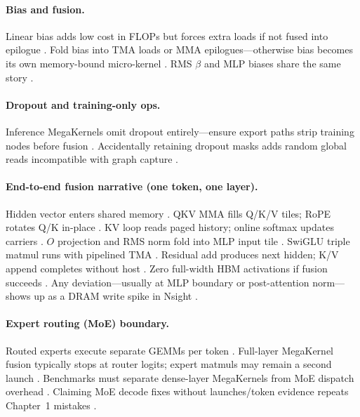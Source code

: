 \paragraph{Bias and fusion.} Linear bias adds low cost in FLOPs but forces extra loads if not fused into epilogue \citep{nvidia2022hopper,chen2020compilerbasedhardw}. Fold bias into TMA loads or MMA epilogues---otherwise bias becomes its own memory-bound micro-kernel \citep{semianalysis2024tma,taxbreak2026}. RMS $\beta$ and MLP biases share the same story \citep{patel2025llminference,yirage2026}.

\paragraph{Dropout and training-only ops.} Inference MegaKernels omit dropout entirely---ensure export paths strip training nodes before fusion \citep{dlbook,chen2020compilerbasedhardw}. Accidentally retaining dropout masks adds random global reads incompatible with graph capture \citep{nvidia2024cudagraphs,memoryfloor2026}.

\paragraph{End-to-end fusion narrative (one token, one layer).} Hidden vector enters shared memory \citep{semianalysis2024tma}. QKV MMA fills Q/K/V tiles; RoPE rotates Q/K in-place \citep{patel2025llminference,dao2022flashattention}. KV loop reads paged history; online softmax updates carriers \citep{kwon2023vllm,dao2023flashdecoding}. $O$ projection and RMS norm fold into MLP input tile \citep{memoryfloor2026,chen2020compilerbasedhardw}. SwiGLU triple matmul runs with pipelined TMA \citep{liu2024deepseekv3,semianalysis2024tma}. Residual add produces next hidden; K/V append completes without host \citep{taxbreak2026,nvidia2024cudagraphs}. Zero full-width HBM activations if fusion succeeds \citep{memoryfloor2026,yirage2026}. Any deviation---usually at MLP boundary or post-attention norm---shows up as a DRAM write spike in Nsight \citep{semianalysis2024tma,taxbreak2026}.

\paragraph{Expert routing (MoE) boundary.} Routed experts execute separate GEMMs per token \citep{liu2024deepseekv3,taxbreak2026}. Full-layer MegaKernel fusion typically stops at router logits; expert matmuls may remain a second launch \citep{patel2025llminference,kwon2023vllm}. Benchmarks must separate dense-layer MegaKernels from MoE dispatch overhead \citep{taxbreak2026,liu2024deepseekv3}. Claiming MoE decode fixes without launches/token evidence repeats Chapter~1 mistakes \citep{memoryfloor2026,dao2022flashattention}.

